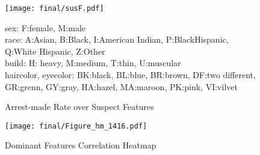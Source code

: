 \begin{figure}[htbp]
    \centering
    \texttt{[image: final/susF.pdf]}
    \caption{Arrest-made Rate over Suspect Features}
    \footnotesize{sex: F:female, M:male\\
    race: A:Asian, B:Black, I:American Indian, P:BlackHispanic, Q:White Hispanic, Z:Other\\
    build: H: heavy, M:medium, T:thin, U:muscular\\
    haircolor, eyecolor: BK:black,
BL:blue,
BR:brown,
DF:two different,
GR:grenn,
GY:gray,
HA:hazel,
MA:maroon,
PK:pink,
VI:vilvet
}
    \label{fig:susF}
\end{figure}


\begin{figure}[htbp]
    \centering
    \texttt{[image: final/Figure\_hm\_1416.pdf]}
    \caption{Dominant Features Correlation Heatmap}
    \label{fig:hm}
\end{figure}

